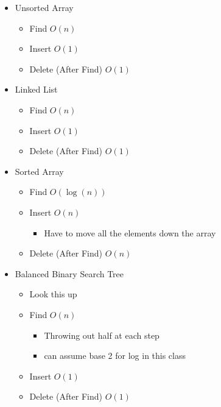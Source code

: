 \documentclass[11pt]{article}
\begin{document}
    \begin{itemize}
        
        \item Unsorted Array
            \begin{itemize}
                \item Find $O\left( n \right) $ 
                \item Insert $O\left( 1 \right) $ 
                \item Delete (After Find) $O\left( 1 \right) $
            \end{itemize}

        \item Linked List
            \begin{itemize}
                \item Find $O\left( n \right) $ 
                \item Insert $O\left( 1 \right) $ 
                \item Delete (After Find) $O\left( 1 \right) $
            \end{itemize}

        \item Sorted Array
            \begin{itemize}
                \item Find $O\left( \log(n) \right) $ 
                \item Insert $O\left( n \right) $ 
                    \begin{itemize}
                        \item Have to move all the elements down the array
                    \end{itemize}
                \item Delete (After Find) $O\left( n \right) $
            \end{itemize}

        \item Balanced Binary Search Tree
            \begin{itemize}
                \color{red}
                \item Look this up
                \color{black}
                \item Find $O\left( n \right) $ 
                    \begin{itemize}
                        \item Throwing out half at each step
                        \item can assume base 2 for log in this class
                    \end{itemize}
                \item Insert $O\left( 1 \right) $ 
                \item Delete (After Find) $O\left( 1 \right) $
            \end{itemize}


\end{itemize}
\end{document}
